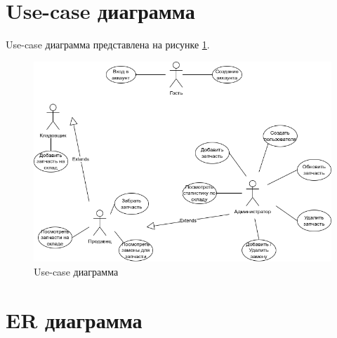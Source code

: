 \section{Use-case диаграмма}
Use-case диаграмма представлена на рисунке \ref{img:usecase-diagram}.
\begin{center}
	\begin{figure}[H]
		\centering
		\includegraphics[scale=0.5]{inc/img/use-case.png}
		\caption{Use-case диаграмма}
		\label{img:usecase-diagram}
	\end{figure}
\end{center}

\section{ER диаграмма}

